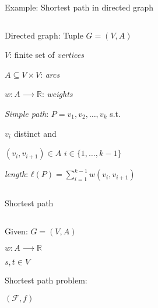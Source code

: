 \begin{frame}{Example: Shortest path in directed graph}

    \begin{columns}[t]
      \begin{column}{.5\textwidth}        
       Directed graph: Tuple  $G = (V,A)$

       \medskip
       $V$: finite set of \emph{vertices}

       \medskip
       $A ⊆ V ×V$: \emph{arcs}

       \medskip

       $w: A ⟶ ℝ$: \emph{weights}

       \medskip 
       \emph{Simple path}:  $P = v_1,v_2,\dots,v_k$  s.t.

       \smallskip 
       $v_i$ distinct and

       \smallskip 
       $(v_i,v_{i+1}) ∈A$  $i ∈ \{1,\dots,k-1\}$ 

       \medskip
\emph{length}: 
    $ℓ(P) = ∑_{i=1}^{k-1 } w(v_i,v_{i+1})$ 
  \end{column}
  \begin{column}{.5\textwidth}
    
    
       
    

  \end{column}       
\end{columns}
\end{frame}


\begin{frame}{Shortest path}

    \begin{columns}
      \begin{column}{.5\textwidth}
        Given: $G = (V,A)$

        \medskip
        $w: A ⟶ ℝ$

        \medskip
        $s,t ∈ V$ 


        \bigskip
        Shortest path problem:

        \medskip 
        $(ℱ,f)$ 
      \end{column}
      \begin{column}{.5\textwidth}

      \end{column}       
    \end{columns}
  \end{frame}


